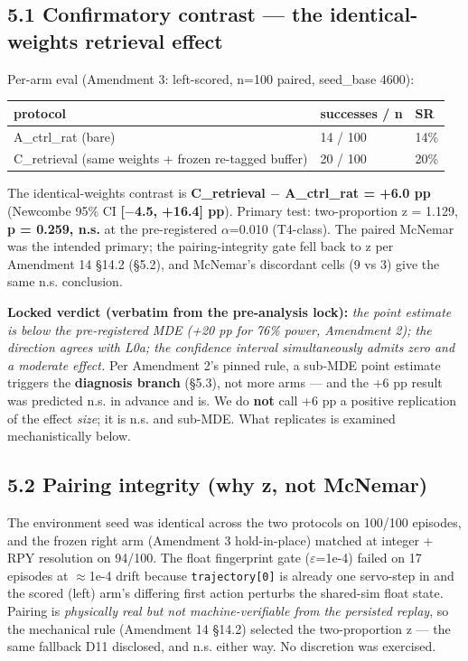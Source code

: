 \subsection*{5.1 Confirmatory contrast --- the identical-weights retrieval effect}

Per-arm eval (Amendment 3: left-scored, n=100 paired, seed\_base 4600):

\begin{table}[h]
\centering
\begin{tabular}{l l l}
\toprule
protocol & successes / n & SR \\
\midrule
A\_ctrl\_rat (bare) & 14 / 100 & 14\% \\
C\_retrieval (same weights + frozen re-tagged buffer) & 20 / 100 & 20\% \\
\bottomrule
\end{tabular}
\end{table}

The identical-weights contrast is \textbf{C\_retrieval $-$ A\_ctrl\_rat = +6.0 pp}
(Newcombe 95\% CI \textbf{[$-$4.5, +16.4] pp}). Primary test: two-proportion
z = 1.129, \textbf{p = 0.259, n.s.} at the pre-registered $\alpha$=0.010 (T4-class).
The paired McNemar was the intended primary; the pairing-integrity gate
fell back to z per Amendment 14 \S14.2 (\S5.2), and McNemar's discordant
cells (9 vs 3) give the same n.s. conclusion.

\textbf{Locked verdict (verbatim from the pre-analysis lock):} \emph{the point
estimate is below the pre-registered MDE (+20 pp for 76\% power, Amendment
2); the direction agrees with L0a; the confidence interval simultaneously
admits zero and a moderate effect.} Per Amendment 2's pinned rule, a
sub-MDE point estimate triggers the \textbf{diagnosis branch} (\S5.3), not more
arms --- and the +6 pp result was predicted n.s. in advance and is. We do
\textbf{not} call +6 pp a positive replication of the effect \emph{size}; it is n.s.
and sub-MDE. What replicates is examined mechanistically below.

\subsection*{5.2 Pairing integrity (why z, not McNemar)}

The environment seed was identical across the two protocols on 100/100
episodes, and the frozen right arm (Amendment 3 hold-in-place) matched at
integer + RPY resolution on 94/100. The float fingerprint gate ($\varepsilon$=1e-4)
failed on 17 episodes at $\approx$1e-4 drift because \texttt{trajectory[0]} is already
one servo-step in and the scored (left) arm's differing first action
perturbs the shared-sim float state. Pairing is \emph{physically real but not
machine-verifiable from the persisted replay}, so the mechanical rule
(Amendment 14 \S14.2) selected the two-proportion z --- the same fallback
D11 disclosed, and n.s. either way. No discretion was exercised.


